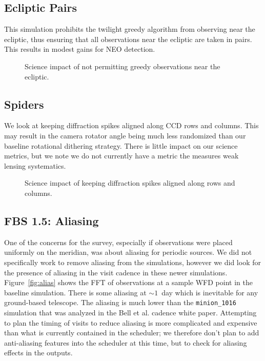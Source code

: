 \subsection{Ecliptic Pairs}

This simulation prohibits the twilight greedy algorithm from observing near the ecliptic, thus ensuring that all observations near the ecliptic are taken in pairs. This results in modest gains for NEO detection. 


\begin{figure}
\caption{Science impact of not permitting greedy observations near the ecliptic. }
\end{figure}


\subsection{Spiders}

We look at keeping diffraction spikes aligned along CCD rows and columns. This may result in the camera rotator angle being much less randomized than our baseline rotational dithering strategy. There is little impact on our science metrics, but we note we do not currently have a metric the measures weak lensing systematics.

\begin{figure}
\caption{Science impact of keeping diffraction spikes aligned along rows and columns. }
\end{figure}


\subsection{FBS 1.5: Aliasing}

One of the concerns for the survey, especially if observations were placed uniformly on the meridian, was about aliasing for periodic sources. We did not specifically work to remove aliasing from the simulations, however we did look for the presence of aliasing in the visit cadence in these newer simulations.  Figure~\ref{fig:alias} shows the FFT of observations at a sample WFD point in the baseline simulation. There is some aliasing at $\sim1$\ day which is inevitable for any ground-based telescope.  The aliasing is much lower than the {\tt minion\_1016} simulation that was analyzed in the Bell et al. cadence white paper. Attempting to plan the timing of visits to reduce aliasing is more complicated and expensive than what is currently contained in the scheduler; we therefore don't plan to add anti-aliasing features into the scheduler at this time, but to check for aliasing effects in the outputs.

